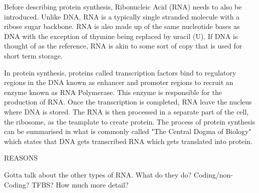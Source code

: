 Before describing protein synthesis, Ribonucleic Acid (RNA) needs to also be introduced. Unlike DNA, RNA is a typically single stranded molecule with a ribose sugar backbone. RNA is also made up of the same nucleotide bases as DNA with the exception of thymine being replaced by uracil (U). If DNA is thought of as the reference, RNA is akin to some sort of copy that is used for short term storage. 

In protein synthesis, proteins called transcription factors bind to regulatory regions in the DNA known as enhancer and promoter regions to recruit an enzyme known as RNA Polymerase. This enzyme is responsible for the production of RNA. Once the transcription is completed, RNA leave the nucleus where DNA is stored. The RNA is then processed in a separate part of the cell, the ribosome, as the teamplate to create protein. 
The process of protein synthesis can be summarised in what is commonly called "The Central Dogma of Biology" which states that DNA gets transcribed RNA which gets translated into protein. 

REASONS 

{\color{red} Gotta talk about the other types of RNA. What do they do? Coding/non-Coding? TFBS? How much more detail?}